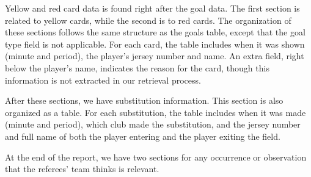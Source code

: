 Yellow and red card data is found right after the goal data.
The first section is related to yellow cards, while the second is to red cards.
The organization of these sections follows the same structure as the goals table, except that the goal type field is not applicable.
For each card, the table includes when it was shown (minute and period), the player's jersey number and name.
An extra field, right below the player's name, indicates the reason for the card, though this information is not extracted in our retrieval process.

After these sections, we have substitution information.
This section is also organized as a table.
For each substitution, the table includes when it was made (minute and period), which club made the substitution, and the jersey number and full name of both the player entering and the player exiting the field.

At the end of the report, we have two sections for any occurrence or observation that the referees' team thinks is relevant.
